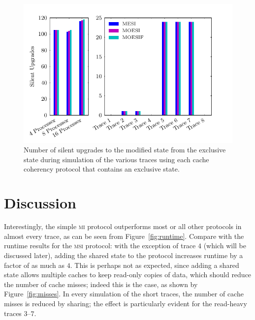\documentclass{article}
\newcommand\figsize{.9\linewidth}
\newcommand\prot[1]{\textsc{#1}}
\newcommand\MI{\prot{mi}\xspace}
\newcommand\MSI{\prot{msi}\xspace}
\begin{document}
  \begin{figure}[htbp]
    \label{fig:upgrades}
    \centering
    \begin{minipage}[t]{\figsize}
      \centering
      \includegraphics[width=\linewidth]{../runs/plots/upgrades}
      \caption{Number of silent upgrades to the modified state from
        the exclusive state during simulation of the various traces
        using each cache coherency protocol that contains an exclusive
        state.}
    \end{minipage}
  \end{figure}


  \section{Discussion}
  \label{sec:discussion}

  Interestingly, the simple \MI protocol outperforms most or all
  other protocols in almost every trace, as can be seen from
  Figure~\ref{fig:runtime}. Compare with the runtime results for the
  \MSI protocol: with the exception of trace $4$ (which will be
  discussed later), adding the shared state to the protocol increases
  runtime by a factor of as much as $4$. This is perhaps not as
  expected, since adding a shared state allows multiple caches to keep
  read-only copies of data, which should reduce the number of cache
  misses; indeed this is the case, as shown by
  Figure~\ref{fig:misses}. In every simulation of the short traces,
  the number of cache misses is reduced by sharing; the effect is
  particularly evident for the read-heavy traces $3$--$7$.
\end{document}
